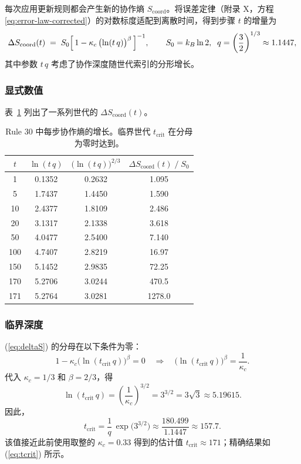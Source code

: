 \documentclass[12pt,a4paper]{article}
\begin{document}
	每次应用更新规则都会产生新的协作熵 \(S_{\mathrm{coord}}\)。将误差定律（附录 X，方程 \eqref{eq:error-law-corrected}）的对数标度适配到离散时间，得到步骤 \(t\) 的增量为
	\begin{equation}
		\Delta S_{\mathrm{coord}}(t) \;=\;
		S_{0}\Bigl[\,1 - \kappa_c\,\bigl(\ln(t\,q)\bigr)^{\beta}\,\Bigr]^{-1},
		\qquad
		S_{0}=k_{B}\ln 2,\;\;
		q = \left(\frac{3}{2}\right)^{1/3}\approx 1.1447,
		\label{eq:deltaS}
	\end{equation}
	其中参数 \(t\,q\) 考虑了协作深度随世代索引的分形增长。
	
	\subsubsection*{显式数值}
	表~\ref{tab:entropy} 列出了一系列世代的 \(\Delta S_{\mathrm{coord}}(t)\)。
	
	\begin{table}[H]
		\centering
		\caption{Rule 30 中每步协作熵的增长。临界世代 \(t_{\mathrm{crit}}\) 在分母为零时达到。}
		\label{tab:entropy}
		\small
		\begin{tabular}{c c c c}
			\toprule
			\(t\) & \(\ln(t\,q)\) & \(\bigl(\ln(t\,q)\bigr)^{2/3}\) &
			\(\Delta S_{\mathrm{coord}}(t)\;/\;S_{0}\) \\
			\midrule
			1    & 0.1352 & 0.2632 & 1.095  \\
			5    & 1.7437 & 1.4450 & 1.590  \\
			10   & 2.4377 & 1.8109 & 2.486  \\
			20   & 3.1317 & 2.1338 & 3.618  \\
			50   & 4.0477 & 2.5400 & 7.140  \\
			100  & 4.7407 & 2.8219 & 16.97  \\
			150  & 5.1452 & 2.9835 & 72.25  \\
			170  & 5.2706 & 3.0244 & 470.5  \\
			171  & 5.2764 & 3.0281 & 1278.0 \\
			\bottomrule
		\end{tabular}
	\end{table}
	
	\subsubsection*{临界深度}
	(\ref{eq:deltaS}) 的分母在以下条件为零：
	\[
	1 - \kappa_c\bigl(\ln(t_{\mathrm{crit}}\,q)\bigr)^{\beta} = 0
	\quad\Longrightarrow\quad
	\bigl(\ln(t_{\mathrm{crit}}\,q)\bigr)^{\beta} = \frac{1}{\kappa_c}.
	\]
	代入 \(\kappa_c = 1/3\) 和 \(\beta = 2/3\)，得
	\begin{equation}
		\ln(t_{\mathrm{crit}}\,q) = \left(\frac{1}{\kappa_c}\right)^{3/2}
		= 3^{3/2} = 3\sqrt{3} \approx 5.19615.
		\label{eq:crit-ln}
	\end{equation}
	因此，
	\begin{equation}
		\boxed{t_{\mathrm{crit}} = \frac{1}{q}\,
			\exp\!\bigl(3^{3/2}\bigr)
			\approx \frac{180.499}{1.1447} \approx 157.7}.
		\label{eq:tcrit}
	\end{equation}
	该值接近此前使用取整的 \(\kappa_c = 0.33\) 得到的估计值 \(t_{\mathrm{crit}}\approx171\)；精确结果如 (\ref{eq:tcrit}) 所示。
	
\end{document}
